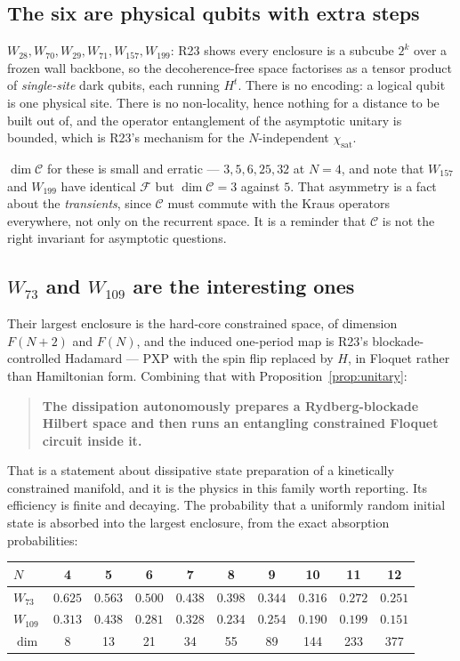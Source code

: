 \documentclass[11pt]{article}
\newcommand{\C}{\mathcal{C}}
\newcommand{\F}{\mathcal{F}}
\theoremstyle{plain}
\theoremstyle{remark}
\begin{document}
\subsection{The six are physical qubits with extra steps}

$W_{28}, W_{70}, W_{29}, W_{71}, W_{157}, W_{199}$: R23 shows every enclosure is
a subcube $2^k$ over a frozen wall backbone, so the decoherence-free space
factorises as a tensor product of \emph{single-site} dark qubits, each running
$H^t$. There is no encoding: a logical qubit is one physical site. There is no
non-locality, hence nothing for a distance to be built out of, and the operator
entanglement of the asymptotic unitary is bounded, which is R23's mechanism for
the $N$-independent $\chi_{\mathrm{sat}}$.

$\dim\C$ for these is small and erratic --- $3, 5, 6, 25, 32$ at $N=4$, and note
that $W_{157}$ and $W_{199}$ have identical $\F$ but $\dim\C = 3$ against $5$.
That asymmetry is a fact about the \emph{transients}, since $\C$ must commute
with the Kraus operators everywhere, not only on the recurrent space. It is a
reminder that $\C$ is not the right invariant for asymptotic questions.

\subsection{\texorpdfstring{$W_{73}$ and $W_{109}$}{W73 and W109} are the interesting ones}

Their largest enclosure is the hard-core constrained space, of dimension
$F(N+2)$ and $F(N)$, and the induced one-period map is R23's blockade-controlled
Hadamard --- PXP with the spin flip replaced by $H$, in Floquet rather than
Hamiltonian form. Combining that with Proposition~\ref{prop:unitary}:

\begin{quote}
\textbf{The dissipation autonomously prepares a Rydberg-blockade Hilbert space
and then runs an entangling constrained Floquet circuit inside it.}
\end{quote}

That is a statement about dissipative state preparation of a kinetically
constrained manifold, and it is the physics in this family worth reporting. Its
efficiency is finite and decaying. The probability that a uniformly random
initial state is absorbed into the largest enclosure, from the exact absorption
probabilities:

\begin{center}
\begin{tabular}{lccccccccc}
\toprule
$N$ & 4 & 5 & 6 & 7 & 8 & 9 & 10 & 11 & 12 \\
\midrule
$W_{73}$  & $0.625$ & $0.563$ & $0.500$ & $0.438$ & $0.398$ & $0.344$ &
  $0.316$ & $0.272$ & $0.251$ \\
$W_{109}$ & $0.313$ & $0.438$ & $0.281$ & $0.328$ & $0.234$ & $0.254$ &
  $0.190$ & $0.199$ & $0.151$ \\
\midrule
$\dim$ & 8 & 13 & 21 & 34 & 55 & 89 & 144 & 233 & 377 \\
\bottomrule
\end{tabular}
\end{center}
\end{document}
